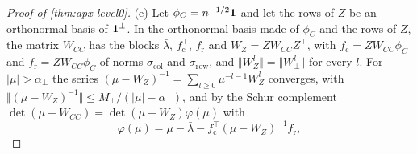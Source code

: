 \begin{proof}[Proof of \cref{thm:apx-level0}]
(e) Let $\phi_C=n^{-1/2}\mathbf{1}$ and let the rows of $Z$ be an orthonormal basis of $\mathbf{1}^\perp$. In the orthonormal basis made of $\phi_C$ and the rows of $Z$, the matrix $W_{CC}$ has the blocks $\bar\lambda$, $f_{\mathrm c}^\top$, $f_{\mathrm r}$ and $W_Z=ZW_{CC}Z^\top$, with $f_{\mathrm c}=ZW_{CC}^\top\phi_C$ and $f_{\mathrm r}=ZW_{CC}\phi_C$ of norms $\sigma_{\mathrm{col}}$ and $\sigma_{\mathrm{row}}$, and $\Vert W_Z^l\Vert=\Vert W_\perp^l\Vert$ for every $l$. For $\lvert\mu\rvert>\alpha_\perp$ the series $(\mu-W_Z)^{-1}=\sum_{l\ge0}\mu^{-l-1}W_Z^l$ converges, with $\Vert(\mu-W_Z)^{-1}\Vert\le M_\perp/(\lvert\mu\rvert-\alpha_\perp)$, and by the Schur complement $\det(\mu-W_{CC})=\det(\mu-W_Z)\varphi(\mu)$ with
\begin{equation*}
\varphi(\mu)=\mu-\bar\lambda-f_{\mathrm c}^\top(\mu-W_Z)^{-1}f_{\mathrm r},
\end{equation*}

\end{proof}
